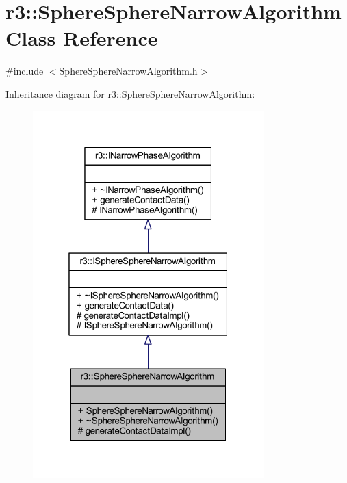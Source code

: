 \hypertarget{classr3_1_1_sphere_sphere_narrow_algorithm}{}\section{r3\+:\+:Sphere\+Sphere\+Narrow\+Algorithm Class Reference}
\label{classr3_1_1_sphere_sphere_narrow_algorithm}


{\ttfamily \#include $<$Sphere\+Sphere\+Narrow\+Algorithm.\+h$>$}



Inheritance diagram for r3\+:\+:Sphere\+Sphere\+Narrow\+Algorithm\+:\nopagebreak
\begin{figure}[H]
\begin{center}
\leavevmode
\includegraphics[width=253pt]{classr3_1_1_sphere_sphere_narrow_algorithm__inherit__graph}
\end{center}
\end{figure}


